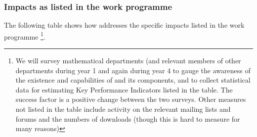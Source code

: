 \subsubsection{Impacts as listed in the work programme}

The following table shows how \TheProject  addresses the specific impacts
listed in the work programme
\footnote{We will survey mathematical departments
(and relevant members of other departments 
during year 1 and again during year 4 to gauge the awareness of the 
existence and capabilities of \TheProject and its components, and to collect
statistical data for estimating Key Performance Indicators listed
in the table. The success factor is a positive change between the two surveys. 
Other measures not listed in the table include activity on the relevant mailing 
lists and forums and the numbers of downloads (though this is hard to measure 
for many reasons)}.

